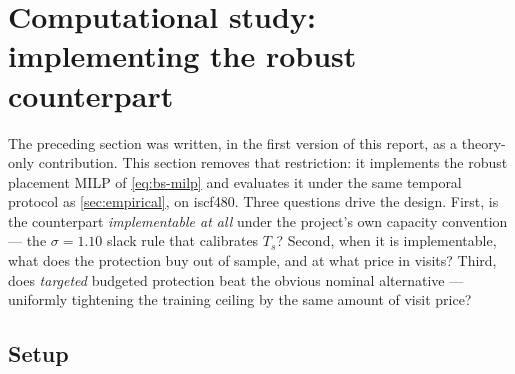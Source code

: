 \section{Computational study: implementing the robust counterpart}
\label{sec:experiment}

The preceding section was written, in the first version of this report, as a
theory-only contribution. This section removes that restriction: it implements
the robust placement MILP of \cref{eq:bs-milp} and evaluates it under the same
temporal protocol as \cref{sec:empirical}, on iscf480. Three questions drive
the design. First, is the counterpart \emph{implementable at all} under the
project's own capacity convention --- the $\sigma = 1.10$ slack rule that
calibrates $T_s$? Second, when it is implementable, what does the protection
buy out of sample, and at what price in visits? Third, does \emph{targeted}
budgeted protection beat the obvious nominal alternative --- uniformly
tightening the training ceiling by the same amount of visit price?

\subsection{Setup}
\label{sec:exp-setup}

